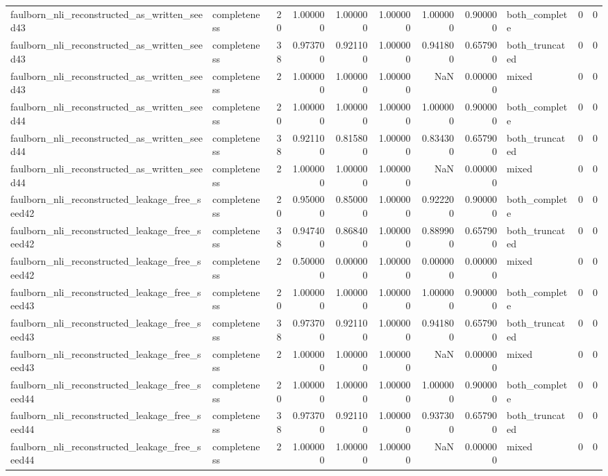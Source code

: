 \begin{tabular}{llrrrrrrlrr}
faulborn_nli_reconstructed_as_written_seed43 & completeness & 20 & 1.000000 & 1.000000 & 1.000000 & 1.000000 & 0.900000 & both_complete & 0 & 0 \\
faulborn_nli_reconstructed_as_written_seed43 & completeness & 38 & 0.973700 & 0.921100 & 1.000000 & 0.941800 & 0.657900 & both_truncated & 0 & 0 \\
faulborn_nli_reconstructed_as_written_seed43 & completeness & 2 & 1.000000 & 1.000000 & 1.000000 & NaN & 0.000000 & mixed & 0 & 0 \\
faulborn_nli_reconstructed_as_written_seed44 & completeness & 20 & 1.000000 & 1.000000 & 1.000000 & 1.000000 & 0.900000 & both_complete & 0 & 0 \\
faulborn_nli_reconstructed_as_written_seed44 & completeness & 38 & 0.921100 & 0.815800 & 1.000000 & 0.834300 & 0.657900 & both_truncated & 0 & 0 \\
faulborn_nli_reconstructed_as_written_seed44 & completeness & 2 & 1.000000 & 1.000000 & 1.000000 & NaN & 0.000000 & mixed & 0 & 0 \\
faulborn_nli_reconstructed_leakage_free_seed42 & completeness & 20 & 0.950000 & 0.850000 & 1.000000 & 0.922200 & 0.900000 & both_complete & 0 & 0 \\
faulborn_nli_reconstructed_leakage_free_seed42 & completeness & 38 & 0.947400 & 0.868400 & 1.000000 & 0.889900 & 0.657900 & both_truncated & 0 & 0 \\
faulborn_nli_reconstructed_leakage_free_seed42 & completeness & 2 & 0.500000 & 0.000000 & 1.000000 & 0.000000 & 0.000000 & mixed & 0 & 0 \\
faulborn_nli_reconstructed_leakage_free_seed43 & completeness & 20 & 1.000000 & 1.000000 & 1.000000 & 1.000000 & 0.900000 & both_complete & 0 & 0 \\
faulborn_nli_reconstructed_leakage_free_seed43 & completeness & 38 & 0.973700 & 0.921100 & 1.000000 & 0.941800 & 0.657900 & both_truncated & 0 & 0 \\
faulborn_nli_reconstructed_leakage_free_seed43 & completeness & 2 & 1.000000 & 1.000000 & 1.000000 & NaN & 0.000000 & mixed & 0 & 0 \\
faulborn_nli_reconstructed_leakage_free_seed44 & completeness & 20 & 1.000000 & 1.000000 & 1.000000 & 1.000000 & 0.900000 & both_complete & 0 & 0 \\
faulborn_nli_reconstructed_leakage_free_seed44 & completeness & 38 & 0.973700 & 0.921100 & 1.000000 & 0.937300 & 0.657900 & both_truncated & 0 & 0 \\
faulborn_nli_reconstructed_leakage_free_seed44 & completeness & 2 & 1.000000 & 1.000000 & 1.000000 & NaN & 0.000000 & mixed & 0 & 0 \\

\end{tabular}
